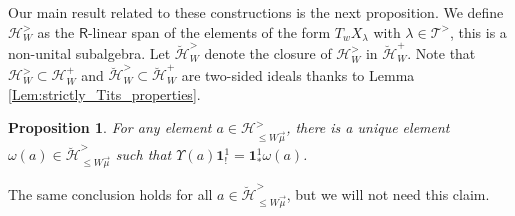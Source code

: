 \documentclass{amsart}
\newcommand{\Hecke}{\mathcal{H}}
\newcommand{\Ring}{\mathsf{R}}
\newcommand{\bone}{\mathbf{1}}
\newtheorem{Prop}[Thm]{Proposition}
\theoremstyle{definition}
\numberwithin{equation}{section}
\begin{document}
Our main result related to these constructions is the next proposition. We define $\Hecke^>_W$ as the $\Ring$-linear span of the elements of the form $T_w X_\lambda$ with $\lambda\in \mathcal{T}^>$, this is a non-unital subalgebra. Let $\breve{\Hecke}^>_W$ denote the closure of $\Hecke^>_W$ in $\breve{\Hecke}^+_W$. Note that $\Hecke_W^>\subset\Hecke_W^+$ and
$\breve{\Hecke}_W^>\subset\breve{\Hecke}_W^+$ are two-sided ideals thanks to Lemma \ref{Lem:strictly_Tits_properties}.

\begin{Prop}\label{Prop:action_description}
For any element  $a\in \Hecke_{\leqslant W\vec{\mu}}^>$, there is a unique element $\omega(a)\in \breve{\Hecke}_{\leqslant W\vec{\mu}}^>$ such that
$\Upsilon(a)\bone_!^1=\bone_*^1\omega(a)$.
\end{Prop}
The same conclusion holds for all $a\in \breve{\Hecke}_{\leqslant W\vec{\mu}}^>$, but we will not need this claim.
\end{document}
